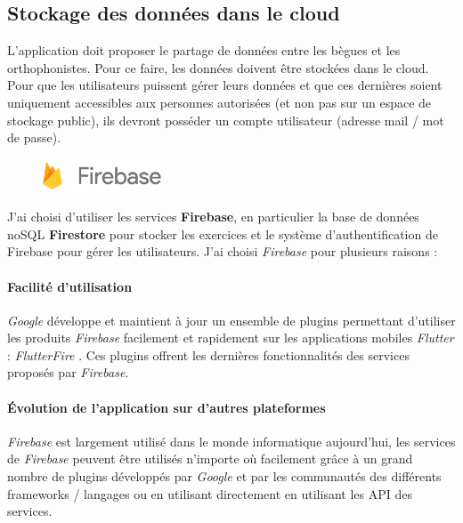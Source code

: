 \subsection{Stockage des données dans le cloud}

L'application doit proposer le partage de données entre les bègues et les orthophonistes. Pour ce faire, les données doivent être stockées dans le cloud. Pour que les utilisateurs puissent gérer leurs données et que ces dernières soient uniquement accessibles aux personnes autorisées (et non pas sur un espace de stockage public), ils devront posséder un compte utilisateur (adresse mail / mot de passe).

\begin{figure}
  \includegraphics[width=100pt]{content/imgs/firebase.png}
\end{figure}
J'ai choisi d'utiliser les services \textbf{Firebase}, en particulier la base de données noSQL \textbf{Firestore} pour stocker les exercices et le système d'authentification de Firebase pour gérer les utilisateurs. J'ai choisi \textit{Firebase} pour plusieurs raisons :

\paragraph{Facilité d'utilisation}
\textit{Google} développe et maintient à jour un ensemble de plugins permettant d'utiliser les produits \textit{Firebase} facilement et rapidement sur les applications mobiles \textit{Flutter} :  \textit{FlutterFire} \cite{flutterfire}. Ces plugins offrent les dernières fonctionnalités des services proposés par \textit{Firebase}.

\paragraph{Évolution de l'application sur d'autres plateformes}
\textit{Firebase} est largement utilisé dans le monde informatique aujourd'hui, les services de \textit{Firebase} peuvent être utilisés n'importe où facilement grâce à un grand nombre de plugins développés par \textit{Google} et par les communautés des différents frameworks / langages ou en utilisant directement en utilisant les API des services.

